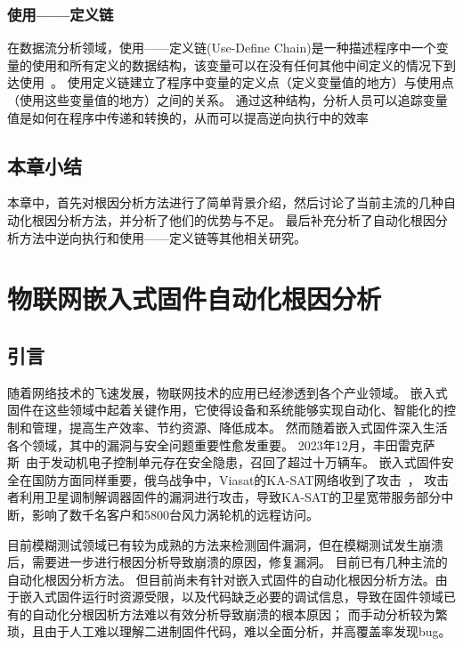 \subsubsection{使用——定义链}
在数据流分析领域，使用——定义链(Use-Define Chain)是一种描述程序中一个变量的使用和所有定义的数据结构，该变量可以在没有任何其他中间定义的情况下到达使用~\cite{Compilers2007}。
使用定义链建立了程序中变量的定义点（定义变量值的地方）与使用点（使用这些变量值的地方）之间的关系。
通过这种结构，分析人员可以追踪变量值是如何在程序中传递和转换的，从而可以提高逆向执行中的效率

\subsection{本章小结}
本章中，首先对根因分析方法进行了简单背景介绍，然后讨论了当前主流的几种自动化根因分析方法，并分析了他们的优势与不足。
最后补充分析了自动化根因分析方法中逆向执行和使用——定义链等其他相关研究。


\section{物联网嵌入式固件自动化根因分析}    %
\subsection{引言}                         %
随着网络技术的飞速发展，物联网技术的应用已经渗透到各个产业领域。
嵌入式固件在这些领域中起着关键作用，它使得设备和系统能够实现自动化、智能化的控制和管理，提高生产效率、节约资源、降低成本。
然而随着嵌入式固件深入生活各个领域，其中的漏洞与安全问题重要性愈发重要。
2023年12月，丰田雷克萨斯~\cite{toyota}由于发动机电子控制单元存在安全隐患，召回了超过十万辆车。
嵌入式固件安全在国防方面同样重要，俄乌战争中，Viasat的KA-SAT网络收到了攻击~\cite{KASAT}，
攻击者利用卫星调制解调器固件的漏洞进行攻击，导致KA-SAT的卫星宽带服务部分中断，影响了数千名客户和5800台风力涡轮机的远程访问。

目前模糊测试领域已有较为成熟的方法来检测固件漏洞，但在模糊测试发生崩溃后，需要进一步进行根因分析导致崩溃的原因，修复漏洞。
目前已有几种主流的自动化根因分析方法。
但目前尚未有针对嵌入式固件的自动化根因分析方法。由于嵌入式固件运行时资源受限，以及代码缺乏必要的调试信息，导致在固件领域已有的自动化分根因析方法难以有效分析导致崩溃的根本原因；
而手动分析较为繁琐，且由于人工难以理解二进制固件代码，难以全面分析，并高覆盖率发现bug。

